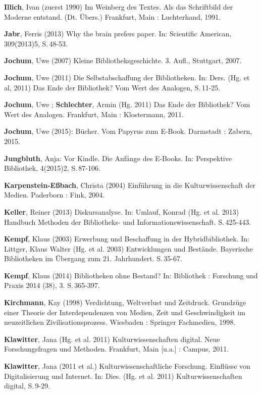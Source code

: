 \documentclass[a4paper,
fontsize=11pt,
oneside,
numbers=noperiodatend,
parskip=half-,
bibliography=totoc,
final
]{scrartcl}
\begin{document}
\textbf{Illich}, Ivan (zuerst 1990) Im Weinberg des Textes. Als das
Schriftbild der Moderne entstand. (Dt. Übers.) Frankfurt, Main :
Luchterhand, 1991.

\textbf{Jabr}, Ferris (2013) Why the brain prefers paper. In: Scientific
American, 309(2013)5, S.\,48-53.

\textbf{Jochum}, Uwe (2007) Kleine Bibliotheksgeschichte. 3. Aufl.,
Stuttgart, 2007.

\textbf{Jochum}, Uwe (2011) Die Selbstabschaffung der Bibliotheken. In:
Ders. (Hg. et al, 2011) Das Ende der Bibliothek? Vom Wert des Analogen,
S.\,11-25.

\textbf{Jochum}, Uwe ; \textbf{Schlechter}, Armin (Hg. 2011) Das Ende
der Bibliothek? Vom Wert des Analogen. Frankfurt, Main : Klostermann,
2011.

\textbf{Jochum}, Uwe (2015): Bücher. Vom Papyrus zum E-Book. Darmstadt :
Zabern, 2015.

\textbf{Jungbluth}, Anja: Vor Kindle. Die Anfänge des E-Books. In:
Perspektive Bibliothek, 4(2015)2, S.\,87-106.

\textbf{Karpenstein-Eßbach}, Christa (2004) Einführung in die
Kulturwissenschaft der Medien. Paderborn : Fink, 2004.

\textbf{Keller}, Reiner (2013) Diskursanalyse. In: Umlauf, Konrad (Hg.
et al. 2013) Handbuch Methoden der Bibliotheks- und
Informationswissenschaft. S.\,425-443.

\textbf{Kempf}, Klaus (2003) Erwerbung und Beschaffung in der
Hybridbibliothek. In: Littger, Klaus Walter (Hg. et al. 2003)
Entwicklungen und Bestände. Bayerische Bibliotheken im Übergang zum 21.
Jahrhundert. S.\,35-67.

\textbf{Kempf}, Klaus (2014) Bibliotheken ohne Bestand? In: Bibliothek :
Forschung und Praxis 2014 (38), 3. S.\,365-397.

\textbf{Kirchmann}, Kay (1998) Verdichtung, Weltverlust und Zeitdruck.
Grundzüge einer Theorie der Interdependenzen von Medien, Zeit und
Geschwindigkeit im neuzeitlichen Zivilisationsprozess. Wiesbaden :
Springer Fachmedien, 1998.

\textbf{Klawitter}, Jana (Hg. et al. 2011) Kulturwissenschaften digital.
Neue Forschungsfragen und Methoden. Frankfurt, Main {[}u.a.{]} : Campus,
2011.

\textbf{Klawitter}, Jana (2011 et al.) Kulturwissenschaftliche
Forschung. Einflüsse von Digitalisierung und Internet. In: Dies. (Hg. et
al. 2011) Kulturwissenschaften digital, S.\,9-29.
\end{document}
